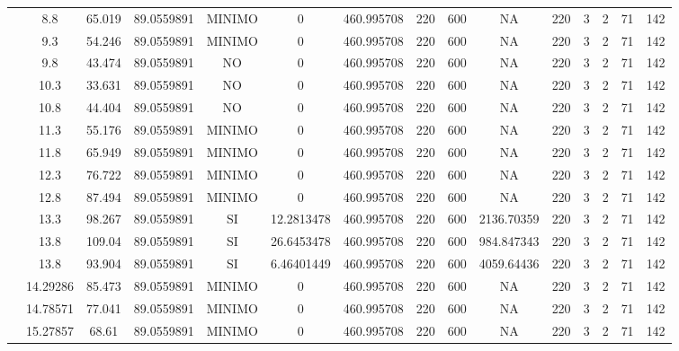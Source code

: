 \begin{table}[H]
{\begin{tabular}{|c|c|c|c|c|c|c|c|c|c|c|c|c|c|c|}
\cline{2-15}    & 8.8 & 65.019 & 89.0559891 & MINIMO & 0   & 460.995708 & 220 & 600 & NA  & 220 & 3   & 2   & 71  & 142 \bigstrut\\
\cline{2-15}    & 9.3 & 54.246 & 89.0559891 & MINIMO & 0   & 460.995708 & 220 & 600 & NA  & 220 & 3   & 2   & 71  & 142 \bigstrut\\
\cline{2-15}    & 9.8 & 43.474 & 89.0559891 & NO  & 0   & 460.995708 & 220 & 600 & NA  & 220 & 3   & 2   & 71  & 142 \bigstrut\\
\cline{2-15}    & 10.3 & 33.631 & 89.0559891 & NO  & 0   & 460.995708 & 220 & 600 & NA  & 220 & 3   & 2   & 71  & 142 \bigstrut\\
\cline{2-15}    & 10.8 & 44.404 & 89.0559891 & NO  & 0   & 460.995708 & 220 & 600 & NA  & 220 & 3   & 2   & 71  & 142 \bigstrut\\
\cline{2-15}    & 11.3 & 55.176 & 89.0559891 & MINIMO & 0   & 460.995708 & 220 & 600 & NA  & 220 & 3   & 2   & 71  & 142 \bigstrut\\
\cline{2-15}    & 11.8 & 65.949 & 89.0559891 & MINIMO & 0   & 460.995708 & 220 & 600 & NA  & 220 & 3   & 2   & 71  & 142 \bigstrut\\
\cline{2-15}    & 12.3 & 76.722 & 89.0559891 & MINIMO & 0   & 460.995708 & 220 & 600 & NA  & 220 & 3   & 2   & 71  & 142 \bigstrut\\
\cline{2-15}    & 12.8 & 87.494 & 89.0559891 & MINIMO & 0   & 460.995708 & 220 & 600 & NA  & 220 & 3   & 2   & 71  & 142 \bigstrut\\
\cline{2-15}    & 13.3 & 98.267 & 89.0559891 & SI  & 12.2813478 & 460.995708 & 220 & 600 & 2136.70359 & 220 & 3   & 2   & 71  & 142 \bigstrut\\
\cline{2-15}    & 13.8 & 109.04 & 89.0559891 & SI  & 26.6453478 & 460.995708 & 220 & 600 & 984.847343 & 220 & 3   & 2   & 71  & 142 \bigstrut\\
\cline{2-15}    & 13.8 & 93.904 & 89.0559891 & SI  & 6.46401449 & 460.995708 & 220 & 600 & 4059.64436 & 220 & 3   & 2   & 71  & 142 \bigstrut\\
\cline{2-15}    & 14.29286 & 85.473 & 89.0559891 & MINIMO & 0   & 460.995708 & 220 & 600 & NA  & 220 & 3   & 2   & 71  & 142 \bigstrut\\
\cline{2-15}    & 14.78571 & 77.041 & 89.0559891 & MINIMO & 0   & 460.995708 & 220 & 600 & NA  & 220 & 3   & 2   & 71  & 142 \bigstrut\\
\cline{2-15}    & 15.27857 & 68.61 & 89.0559891 & MINIMO & 0   & 460.995708 & 220 & 600 & NA  & 220 & 3   & 2   & 71  & 142 \bigstrut\\

\end{tabular}}
\end{table}
